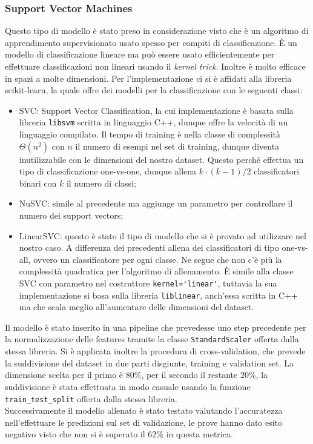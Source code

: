\subsubsection{Support Vector Machines}
Questo tipo di modello è stato preso in considerazione visto che è un algoritmo di apprendimento supervisionato usato spesso per compiti di classificazione. È un modello di classificazione lineare ma può essere usato efficientemente per effettuare classificazioni non lineari usando il \textit{kernel trick}. Inoltre è molto efficace in spazi a molte dimensioni.
Per l'implementazione ci si è affidati alla libreria scikit-learn, la quale offre dei modelli per la classificazione con le seguenti classi:
\begin{itemize}
    \item SVC: Support Vector Classification, la cui implementazione è basata sulla libreria \verb|libsvm| scritta in linguaggio C++, dunque offre la velocità di un linguaggio compilato. Il tempo di training è nella classe di complessità $\Theta (n^2)$ con $n$ il numero di esempi nel set di training, dunque diventa inutilizzabile con le dimensioni del nostro dataset. Questo perché effettua un tipo di classificazione one-vs-one, dunque allena $k \cdot (k-1)/2$ classificatori binari con $k$ il numero di classi;
    \item NuSVC: simile al precedente ma aggiunge un parametro per controllare il numero dei support vectors;
    \item LinearSVC: questo è stato il tipo di modello che si è provato ad utilizzare nel nostro caso. A differenza dei precedenti allena dei classificatori di tipo one-vs-all, ovvero un classificatore per ogni classe. Ne segue che non c'è più la complessità quadratica per l'algoritmo di allenamento. È simile alla classe SVC con parametro nel costruttore \verb|kernel='linear'|, tuttavia la sua implementazione si basa sulla libreria \verb|liblinear|, anch'essa scritta in C++ ma che scala meglio all'aumentare delle dimensioni del dataset.
\end{itemize}
Il modello è stato inserito in una pipeline che prevedesse uno step precedente per la normalizzazione delle features tramite la classe \verb|StandardScaler| offerta dalla stessa libreria. Si è applicata inoltre la procedura di cross-validation, che prevede la suddivisione del dataset in due parti disgiunte, training e validation set. La dimensione scelta per il primo è $80\%$, per il secondo il restante $20\%$, la suddivisione è stata effettuata in modo casuale usando la funzione \verb|train_test_split| offerta dalla stessa libreria.\\
Successivamente il modello allenato è stato testato valutando l'accuratezza nell'effettuare le predizioni sul set di validazione, le prove hanno dato esito negativo visto che non si è superato il $62\%$ in questa metrica.

